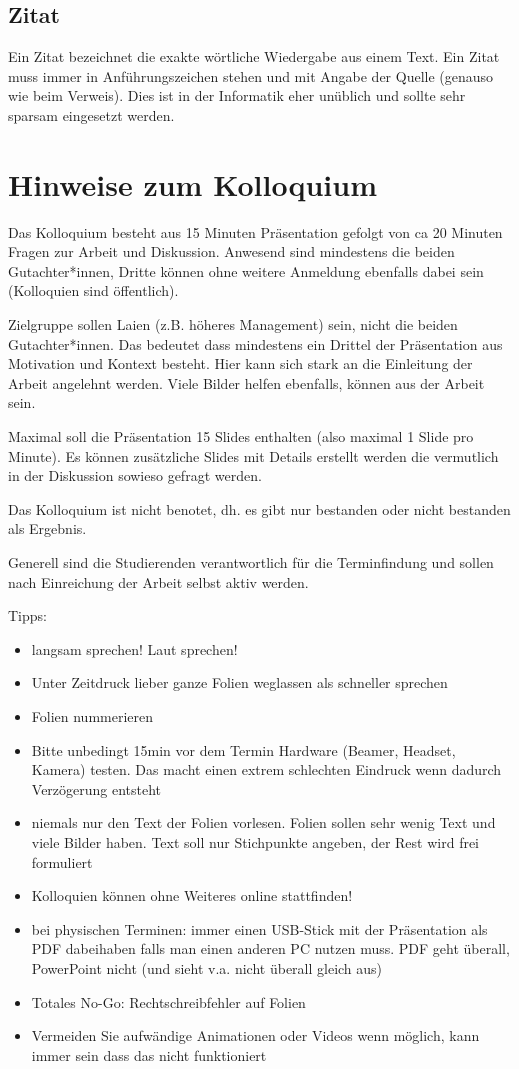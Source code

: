 \subsection{Zitat}
Ein Zitat bezeichnet die exakte wörtliche Wiedergabe aus einem Text. Ein Zitat muss immer in
Anführungszeichen stehen und mit Angabe der Quelle (genauso wie beim Verweis). Dies ist in der Informatik eher unüblich und sollte sehr sparsam eingesetzt werden.

\section{Hinweise zum Kolloquium}
Das Kolloquium besteht aus 15 Minuten Präsentation gefolgt von ca 20 Minuten Fragen zur Arbeit und Diskussion. Anwesend sind mindestens die beiden Gutachter*innen, Dritte können ohne weitere Anmeldung ebenfalls dabei sein (Kolloquien sind öffentlich). 

Zielgruppe sollen Laien (z.B. höheres Management) sein, nicht die beiden Gutachter*innen. Das bedeutet dass mindestens ein Drittel der Präsentation aus Motivation und Kontext besteht. Hier kann sich stark an die Einleitung der Arbeit angelehnt werden. Viele Bilder helfen ebenfalls, können aus der Arbeit sein.

Maximal soll die Präsentation 15 Slides enthalten (also maximal 1 Slide pro Minute). Es können zusätzliche Slides mit Details erstellt werden die vermutlich in der Diskussion sowieso gefragt werden.

Das Kolloquium ist nicht benotet, dh. es gibt nur bestanden oder nicht bestanden als Ergebnis. 

Generell sind die Studierenden verantwortlich für die Terminfindung und sollen nach Einreichung der Arbeit selbst aktiv werden. 

Tipps:
\begin{itemize}
    \item langsam sprechen! Laut sprechen!
    \item Unter Zeitdruck lieber ganze Folien weglassen als schneller sprechen
    \item Folien nummerieren
    \item Bitte unbedingt 15min vor dem Termin Hardware (Beamer, Headset, Kamera) testen. Das macht einen extrem schlechten Eindruck wenn dadurch Verzögerung entsteht
    \item niemals nur den Text der Folien vorlesen. Folien sollen sehr wenig Text und viele Bilder haben. Text soll nur Stichpunkte angeben, der Rest wird frei formuliert
    \item Kolloquien können ohne Weiteres online stattfinden!
    \item bei physischen Terminen: immer einen USB-Stick mit der Präsentation als PDF dabeihaben falls man einen anderen PC nutzen muss. PDF geht überall, PowerPoint nicht (und sieht v.a. nicht überall gleich aus)
    \item Totales No-Go: Rechtschreibfehler auf Folien
    \item Vermeiden Sie aufwändige Animationen oder Videos wenn möglich, kann immer sein dass das nicht funktioniert
\end{itemize}
